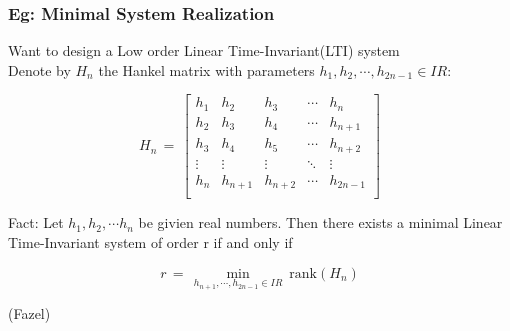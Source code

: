 \documentclass{beamer}
\newcommand{\thalf}{{\textstyle \frac{1}{2}}}
\newcommand{\re}{I\!\!\!R}
\begin{document}
\begin{frame}
\frametitle{Eg: Minimal System Realization}
Want to design a Low order Linear Time-Invariant(LTI) system\\
\medskip
Denote by $H_n$ the Hankel matrix with parameters $h_1,h_2,\cdots,h_{2n-1}\in\re$:
\begin{center}
\begin{equation*}
H_n\,=\,\begin{bmatrix}
h_1&h_2&h_3&\cdots&h_n\\
h_2&h_3&h_4&\cdots&h_{n+1}\\
h_3&h_4&h_5&\cdots&h_{n+2}\\
\vdots&\vdots&\vdots&\ddots&\vdots\\
h_n&h_{n+1}&h_{n+2}&\cdots&h_{2n-1}\\\end{bmatrix}
\end{equation*}
\end{center}
\bigskip
Fact: Let $h_1, h_2, \cdots h_n$ be givien real numbers. Then there exists a minimal Linear Time-Invariant system of order r if and only if
\begin{center}
\begin{displaymath}
r\,=\, \min\limits_{h_{n+1},\cdots,h_{2n-1}\in\re} ~\mbox{rank} (H_n)
\end{displaymath}
\end{center}
(Fazel)
\end{frame}
\end{document}
